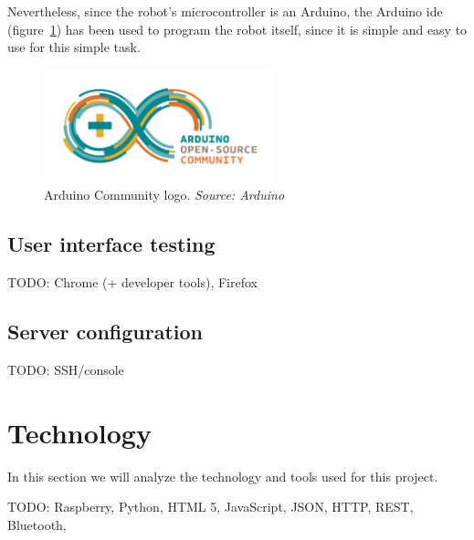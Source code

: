 Nevertheless, since the robot's microcontroller is an Arduino, the Arduino
\acrshort{ide}~\cite{arduino_web} (figure~\ref{fig:arduino}) has been used to program the robot itself,
since it is simple and easy to use for this simple task.

\begin{figure}[!htbp]
	\centering
	\includegraphics[width=0.6\textwidth]{fig/arduino}
	\caption{Arduino Community logo. \emph{Source: Arduino}}
	\label{fig:arduino}
\end{figure}

\subsection{User interface testing}

TODO: Chrome (+ developer tools), Firefox

\subsection{Server configuration}

TODO: SSH/console

\section{Technology}

In this section we will analyze the technology and tools used for this project.




TODO: Raspberry, Python, HTML 5, JavaScript, JSON, HTTP, REST, Bluetooth,
